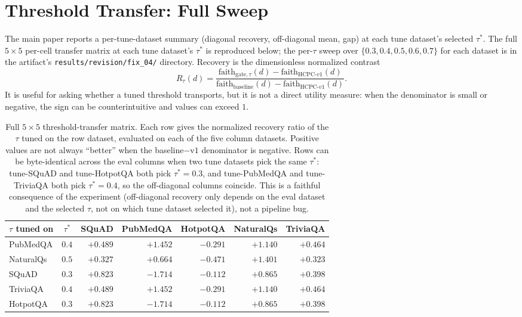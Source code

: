 \documentclass[11pt]{article}
\begin{document}
\section{Threshold Transfer: Full Sweep}
\label{supp:threshold}

The main paper reports a per-tune-dataset summary
(diagonal recovery, off-diagonal mean, gap) at each tune dataset's
selected $\tau^\ast$. The full $5 \times 5$ per-cell transfer matrix at
each tune dataset's $\tau^\ast$ is reproduced below; the per-$\tau$
sweep over $\{0.3, 0.4, 0.5, 0.6, 0.7\}$ for each dataset is in the
artifact's \texttt{results/revision/fix\_04/} directory.
Recovery is the dimensionless normalized contrast
\[
R_\tau(d)=
\frac{\mathrm{faith}_{\mathrm{gate},\tau}(d) -
      \mathrm{faith}_{\mathrm{HCPC}\text{-}v1}(d)}
     {\mathrm{faith}_{\mathrm{baseline}}(d) -
      \mathrm{faith}_{\mathrm{HCPC}\text{-}v1}(d)}.
\]
It is useful for asking whether a tuned threshold transports, but it is
not a direct utility measure: when the denominator is small or negative,
the sign can be counterintuitive and values can exceed $1$.

\begin{table}[!htb]
\centering
\caption{Full $5 \times 5$ threshold-transfer matrix. Each row gives
the normalized recovery ratio of the $\tau$ tuned on the row dataset,
evaluated on each of the five column datasets. Positive values are not
always ``better'' when the baseline$-$v$1$ denominator is negative.
Rows can be byte-identical across the eval columns when two tune
datasets pick the same $\tau^\ast$: tune-SQuAD and tune-HotpotQA both
pick $\tau^\ast = 0.3$, and tune-PubMedQA and tune-TriviaQA both pick
$\tau^\ast = 0.4$, so the off-diagonal columns coincide. This is a
faithful consequence of the experiment (off-diagonal recovery only
depends on the eval dataset and the selected $\tau$, not on which tune
dataset selected it), not a pipeline bug.}
\label{tab:supp:threshold_transfer_full}
\footnotesize
\begin{tabular}{lcrrrrr}
\toprule
$\tau$ tuned on & $\tau^\ast$ & SQuAD & PubMedQA & HotpotQA & NaturalQs & TriviaQA \\
\midrule
PubMedQA  & $0.4$ & $+0.489$ & $+1.452$ & $-0.291$ & $+1.140$ & $+0.464$ \\
NaturalQs & $0.5$ & $+0.327$ & $+0.664$ & $-0.471$ & $+1.401$ & $+0.323$ \\
SQuAD     & $0.3$ & $+0.823$ & $-1.714$ & $-0.112$ & $+0.865$ & $+0.398$ \\
TriviaQA  & $0.4$ & $+0.489$ & $+1.452$ & $-0.291$ & $+1.140$ & $+0.464$ \\
HotpotQA  & $0.3$ & $+0.823$ & $-1.714$ & $-0.112$ & $+0.865$ & $+0.398$ \\
\bottomrule
\end{tabular}
\end{table}
\end{document}
